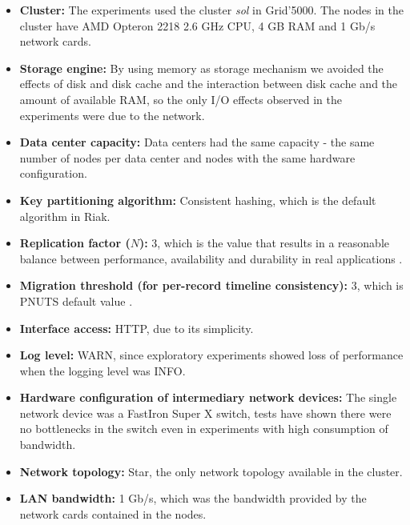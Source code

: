 \documentclass[doublespacing]{bmcart}
\begin{document}
\begin{itemize}

\item \textbf{Cluster:} The experiments used the cluster \textit{sol} in
Grid'5000. The nodes in the cluster have AMD Opteron 2218 2.6 GHz CPU, 4 GB RAM
and 1 Gb/s network cards.

\item \textbf{Storage engine:} By using memory as storage mechanism we avoided
the effects of disk and disk cache and the interaction between disk cache and
the amount of available RAM, so the only I/O effects observed in the
experiments were due to the network.

\item \textbf{Data center capacity:} Data centers had the same capacity - the
same number of nodes per data center and nodes with the same hardware
configuration.

\item \textbf{Key partitioning algorithm:} Consistent hashing, which is the
default algorithm in Riak.

\item \textbf{Replication factor ($ N $):} 3, which is the value that results
in a reasonable balance between performance, availability and durability in
real applications \cite{DeCandia2007}.

\item \textbf{Migration threshold (for per-record timeline consistency):} 3,
which is PNUTS default value \cite{Cooper2008}.

\item \textbf{Interface access:} HTTP, due to its simplicity.

\item \textbf{Log level:} WARN, since exploratory experiments showed loss of
performance when the logging level was INFO.

\item \textbf{Hardware configuration of intermediary network devices:} The
single network device was a FastIron Super X switch, tests have shown there were
no bottlenecks in the switch even in experiments with high consumption of bandwidth.

\item \textbf{Network topology:} Star, the only network topology available in
the cluster.

\item \textbf{LAN bandwidth:} 1 Gb/s, which was the bandwidth provided by the
network cards contained in the nodes.


\end{itemize}
\end{document}
